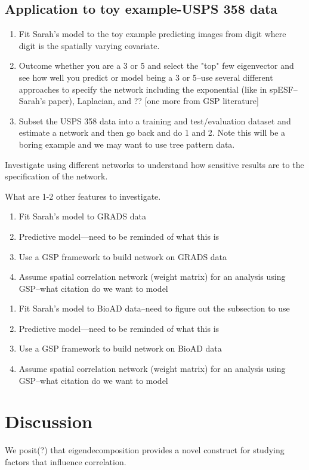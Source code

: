 \documentclass[12pt]{article}
\begin{document}
\subsection{Application to toy example-USPS 358 data}
\begin{enumerate}
	\item Fit Sarah's model to the toy example predicting images from digit where digit is the spatially varying covariate.
	\item Outcome whether you are a 3 or 5 and select the "top" few eigenvector and see how well you predict or model being a 3 or 5--use several different approaches to specify the network including the exponential (like in spESF--Sarah's paper), Laplacian, and ?? [one more from GSP literature]
	\item Subset the USPS 358 data into a training and test/evaluation dataset and estimate a network and then go back and do 1 and 2.  Note this will be a boring example and we may want to use tree pattern data.
\end{enumerate}

Investigate using different networks to understand how sensitive results are to the specification of the network.

What are 1-2 other features to investigate.

\begin{enumerate}
	\item{Fit Sarah's model to GRADS data}
	\item{Predictive model---need to be reminded of what this is}
	\item{Use a GSP framework to build network on GRADS data}
	\item{Assume spatial correlation network (weight matrix) for an analysis using GSP--what citation do we want to model}
\end{enumerate}

\begin{enumerate}
	\item{Fit Sarah's model to BioAD data--need to figure out the subsection to use}
	\item{Predictive model---need to be reminded of what this is}
	\item{Use a GSP framework to build network on BioAD data}
	\item{Assume spatial correlation network (weight matrix) for an analysis using GSP--what citation do we want to model}
\end{enumerate}

\section{Discussion}
We posit(?) that eigendecomposition provides a novel construct for studying factors that influence correlation.
\end{document}
